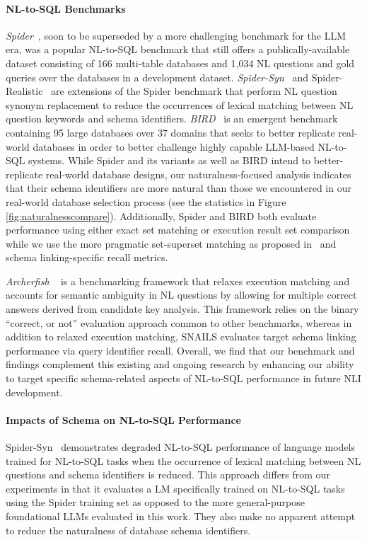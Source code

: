 \paragraph{\textbf{NL-to-SQL Benchmarks}}
\emph{Spider}~\cite{Yu&al.18c}, soon to be superseded by a more challenging benchmark for the LLM era, was a popular NL-to-SQL benchmark that still offers a publically-available dataset consisting of 166 multi-table databases and 1,034 NL questions and gold queries over the databases in a development dataset. 
\emph{Spider-Syn}~\cite{gan-etal-2021-towards} and Spider-Realistic~\cite{gan-etal-2021-towards} are extensions of the Spider benchmark that perform NL question synonym replacement to reduce the occurrences of lexical matching between NL question keywords and schema identifiers.
\emph{BIRD}~\cite{li2023llm} is an emergent benchmark containing 95 large databases over 37 domains that seeks to better replicate real-world databases in order to better challenge highly capable LLM-based NL-to-SQL systems.
While Spider and its variants as well as BIRD intend to better-replicate real-world database designs, our naturalness-focused analysis indicates that their schema identifiers are more natural than those we encountered in our real-world database selection process (see the statistics in Figure \ref{fig:naturalnesscompare}).
Additionally, Spider and BIRD both evaluate performance using either exact set matching or execution result set comparison while we use the more pragmatic set-superset matching as proposed in~\cite{floratou2024nl2sql} and schema linking-specific recall metrics.

\emph{Archerfish}
~\cite{floratou2024nl2sql} is a benchmarking framework that relaxes execution matching and accounts for semantic ambiguity in NL questions by allowing for multiple correct answers derived from candidate key analysis.
This framework relies on the binary ``correct, or not'' evaluation approach common to other benchmarks, whereas in addition to relaxed execution matching, SNAILS evaluates target schema linking performance via query identifier recall.
Overall, we find that our benchmark and findings complement this existing and ongoing research by enhancing our ability to target specific schema-related aspects of NL-to-SQL performance in future NLI development.

\paragraph{\textbf{Impacts of Schema on NL-to-SQL Performance}}
Spider-Syn~\cite{gan-etal-2021-towards} demonstrates degraded NL-to-SQL performance of language models trained for NL-to-SQL tasks when the occurrence of lexical matching between NL questions and schema identifiers is reduced. 
This approach differs from our experiments in that it evaluates a LM specifically trained on NL-to-SQL tasks using the Spider training set as opposed to the more general-purpose foundational LLMs evaluated in this work.
They also make no apparent attempt to reduce the naturalness of  database schema identifiers.

